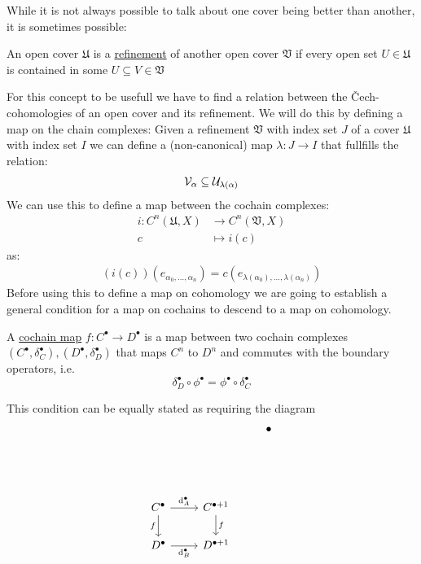 While it is not always possible to talk about one cover being better than another, it is sometimes possible:
\begin{definition}
An open cover $\mathfrak{U}$ is a \underline{refinement} of another open cover
$\mathfrak{V}$ if every open set $U \in \mathfrak{U}$ is contained in some
$U \subseteq V \in \mathfrak{V}$
\end{definition}
For this concept to be usefull we have to find a relation between the Čech-cohomologies of an open cover
and its refinement. We will do this by defining a map on the chain complexes: Given a
refinement $\mathfrak{V}$ with index set $J$ of a cover $\mathfrak{U}$ with index set $I$ we
can define a (non-canonical) map
$\lambda: J \to I$ that fullfills the relation:
\begin{align*}
	\mathcal{V}_\alpha \subseteq \mathcal{U}_{\lambda(\alpha)}
\end{align*}
We can use this to define a map between the cochain complexes:
\begin{align*}
	i: C^n(\mathfrak{U}, X) &\to C^n(\mathfrak{V}, X) \\
		c &\mapsto i(c)
\end{align*}
as:
\begin{align*}
	(i(c))(e_{\alpha_0, \dots, \alpha_n}) = c(e_{\lambda(\alpha_0), \dots, \lambda(\alpha_n)})
\end{align*}
Before using this to define a map on cohomology we are going to establish a general
condition for a map on cochains to descend to a map on cohomology. 
\begin{definition}
A \underline{cochain map} $f: C^\bullet \to D^\bullet$ is a map between two
cochain complexes
$(C^\bullet, \delta_C^\bullet), (D^\bullet, \delta_D^\bullet)$ that maps
$C^n$ to $D^n$ and commutes with the boundary operators, i.e.
\[
	\delta_D^\bullet \circ \phi^\bullet
	=
	\phi^\bullet \circ \delta_C^\bullet
\]
\end{definition}
This condition can be equally stated as requiring the diagram
\[\begin{tikzcd}
	&& \bullet \\
	\\
	\\
	{C^\bullet} & {C^{{\bullet} + 1}} \\
	{D^\bullet} & {D^{{\bullet} + 1}}
	\arrow["{\mathrm{d}_A^\bullet}", from=4-1, to=4-2]
	\arrow["f"', from=4-1, to=5-1]
	\arrow["f", from=4-2, to=5-2]
	\arrow["{\mathrm{d}_B^\bullet}"', from=5-1, to=5-2]
\end{tikzcd}\]
